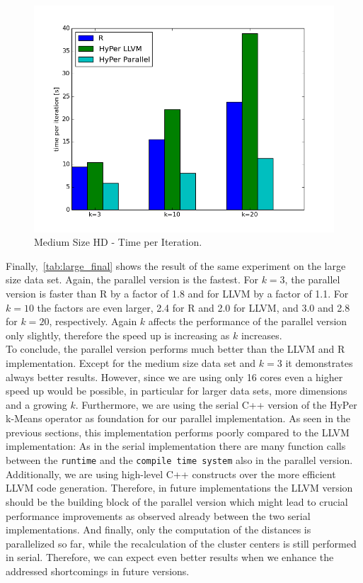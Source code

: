 \begin{figure}[htsb]
  \centering
  \includegraphics[scale=0.5, trim="0cm 1.5cm 0cm 0cm"]{figures/charts/15Mxhd_final}
  \caption[Medium Size HD - Time per Iteration]{Medium Size HD - Time per Iteration.}
  \label{fig:final_15_hd}
\end{figure}

Finally,~\autoref{tab:large_final} shows the result of the same experiment on the large size data set. Again, the parallel version is the fastest. For $k = 3$, the parallel version is faster than R by a factor of 1.8 and for LLVM by a factor of 1.1. For $k = 10$ the factors are even larger, 2.4 for R and 2.0 for LLVM, and 3.0 and 2.8 for $k = 20$, respectively. Again $k$ affects the performance of the parallel version only slightly, therefore the speed up is increasing as $k$ increases.
\\
To conclude, the parallel version performs much better than the LLVM and R implementation. Except for the medium size data set and $k = 3$ it demonstrates always better results. However, since we are using only 16 cores even a higher speed up would be possible, in particular for larger data sets, more dimensions and a growing $k$. Furthermore, we are using the serial C++ version of the HyPer k-Means operator as foundation for our parallel implementation. As seen in the previous sections, this implementation performs poorly compared to the LLVM implementation: As in the serial implementation there are many function calls between the \texttt{runtime} and the \texttt{compile time system} also in the parallel version. Additionally, we are using high-level C++ constructs over the more efficient LLVM code generation. Therefore, in future implementations the LLVM version should be the building block of the parallel version which might lead to crucial performance improvements as observed already between the two serial implementations. And finally, only the computation of the distances is parallelized so far, while the recalculation of the cluster centers is still performed in serial. Therefore, we can expect even better results when we enhance the addressed shortcomings in future versions.


